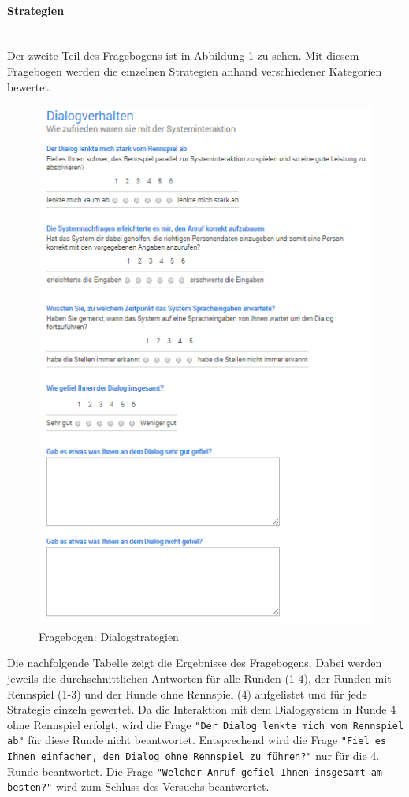 \documentclass[12pt,a4paper]{scrartcl}
\begin{document}
\paragraph{Strategien}
~\\
Der zweite Teil des Fragebogens ist in Abbildung \ref{fbstrategien1} zu sehen. 
Mit diesem Fragebogen werden die einzelnen Strategien anhand verschiedener Kategorien bewertet.
\begin{figure}[H]
\begin{center}
\includegraphics[width=12cm]{fbdialog.png}
\caption{Fragebogen: Dialogstrategien}
\label{fbstrategien1}
\end{center}
\end{figure}
Die nachfolgende Tabelle zeigt die Ergebnisse des Fragebogens. Dabei werden jeweils die durchschnittlichen Antworten für alle Runden (1-4), der Runden mit Rennspiel (1-3) und der Runde ohne Rennspiel (4) aufgelistet und für jede Strategie einzeln gewertet.
\newline \newline
Da die Interaktion mit dem Dialogsystem in Runde 4 ohne Rennspiel erfolgt, wird die Frage \texttt{"Der Dialog lenkte mich vom Rennspiel ab"} für diese Runde nicht beantwortet. Entsprechend wird die Frage \texttt{"Fiel es Ihnen einfacher, den Dialog ohne Rennspiel zu führen?"} nur für die 4. Runde beantwortet.
Die Frage \texttt{"Welcher Anruf gefiel Ihnen insgesamt am besten?"} wird zum Schluss des Versuchs beantwortet.
\newpage
\end{document}
